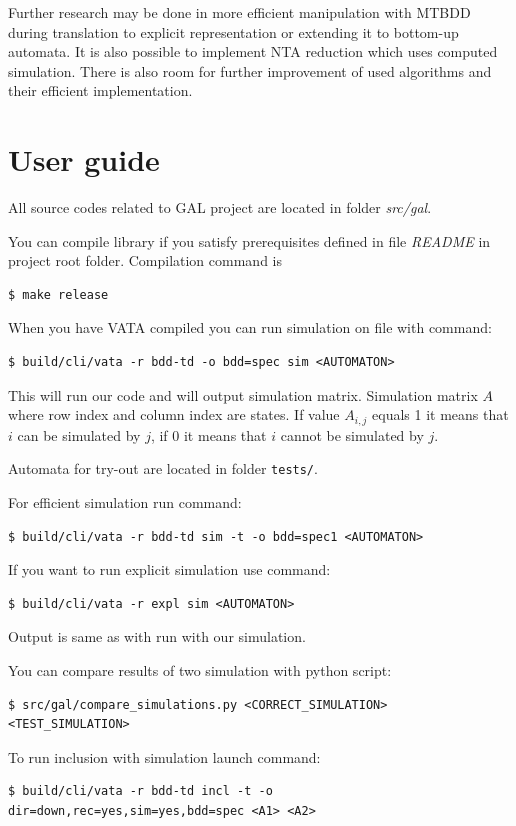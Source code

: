 \documentclass[a4paper, 12pt]{article}
\begin{document}
Further research may be done in more efficient manipulation with MTBDD during translation to explicit representation or
extending it to bottom-up automata.
It is also possible to implement NTA reduction which uses computed simulation.
There is also room for further improvement of used algorithms and their efficient implementation.

\newpage
\appendix
\section{User guide}
\label{app:usage}
All source codes related to GAL project are located in folder \emph{src/gal}.

You can compile library if you satisfy prerequisites defined in file \textit{README} in project root folder. Compilation command is
\begin{verbatim}
$ make release
\end{verbatim}

When you have VATA compiled you can run simulation on file with command:
\begin{verbatim}
$ build/cli/vata -r bdd-td -o bdd=spec sim <AUTOMATON>
\end{verbatim}
This will run our code and will output simulation matrix. Simulation matrix $A$ where row index and column index are states. If value $A_{i,j}$ equals 1 it means that $i$ can be simulated by $j$, if 0 it means that $i$ cannot be simulated by $j$.

Automata for try-out are located in folder \texttt{tests/}.

For efficient simulation run command:
\begin{verbatim}
$ build/cli/vata -r bdd-td sim -t -o bdd=spec1 <AUTOMATON>
\end{verbatim}

If you want to run explicit simulation use command:
\begin{verbatim}
$ build/cli/vata -r expl sim <AUTOMATON>
\end{verbatim}
Output is same as with run with our simulation.

You can compare results of two simulation with python script:
\begin{verbatim}
$ src/gal/compare_simulations.py <CORRECT_SIMULATION> <TEST_SIMULATION>
\end{verbatim}

To run inclusion with simulation launch command:
\begin{verbatim}
$ build/cli/vata -r bdd-td incl -t -o dir=down,rec=yes,sim=yes,bdd=spec <A1> <A2>
\end{verbatim}
\end{document}
